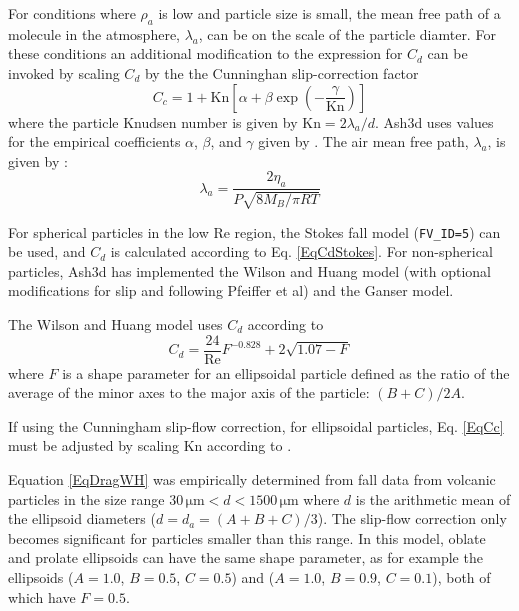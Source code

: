 For conditions where $\rho_a$
is low and particle size is small, the mean free path of a molecule in the
atmosphere, $\lambda_a$, can be on the scale of the particle diamter.  For these
conditions an additional modification to the expression for $C_d$ can
be invoked by scaling $C_d$ by the the Cunninghan slip-correction factor
\begin{equation}
C_c = 1+\mathrm{Kn}\left[\alpha+\beta \exp{\left(-\frac{\gamma}{\mathrm{Kn}}\right)} \right]\label{EqCc}
\end{equation}
where the particle Knudsen number is given by $\mathrm{Kn}=2 \lambda_a / d$.
Ash3d uses values for the empirical coefficients $\alpha$, $\beta$, and
$\gamma$ given by \cite[p.407, Eq.9.34]{Seinfeld06}.
The air mean free path, $\lambda_a$, is given by \cite[p.399, Eq.9.6]{Seinfeld06}:
\begin{equation}
\lambda_a = \frac{2 \eta_a}{P\sqrt{8M_B/\pi R T}}\label{EqLambda}
\end{equation}

For spherical particles in the low $\mathrm{Re}$ region,
the Stokes fall model (\texttt{FV\_ID=5}) can be used, and $C_d$ is calculated
according to Eq. \ref{EqCdStokes}.  For non-spherical particles, Ash3d
has implemented the Wilson and Huang model (with optional modifications for
slip and following Pfeiffer et al) and the Ganser model.

The Wilson and Huang model uses $C_d$ according to
\begin{equation}
C_d = \frac{24}{\mathrm{Re}}F^{-0.828}+2 \sqrt{1.07-F}\label{EqDragWH}
\end{equation}
where $F$ is a shape parameter for an ellipsoidal particle
defined as the ratio of the average of the minor axes to the major axis of
the particle:  $(B+C)/2A$. 

If using the Cunningham slip-flow correction, for ellipsoidal particles,
Eq. \ref{EqCc} must be adjusted by scaling
$\mathrm{Kn}$ according to \cite[Table 1]{Dahneke73c}.

Equation \ref{EqDragWH} was empirically determined from fall data from volcanic
particles in the size range $30 \, \mathrm{\mu m} < d < 1500 \, \mathrm{\mu m}$
where $d$ is the
arithmetic mean of the ellipsoid diameters ($d=d_a=(A+B+C)/3$).  The slip-flow
correction only becomes significant for particles smaller than this range.
In this model, oblate and prolate ellipsoids can have the same shape parameter,
as for example the ellipsoids ($A=1.0$, $B=0.5$, $C=0.5$) and 
($A=1.0$, $B=0.9$, $C=0.1$), both of which have $F=0.5$.

